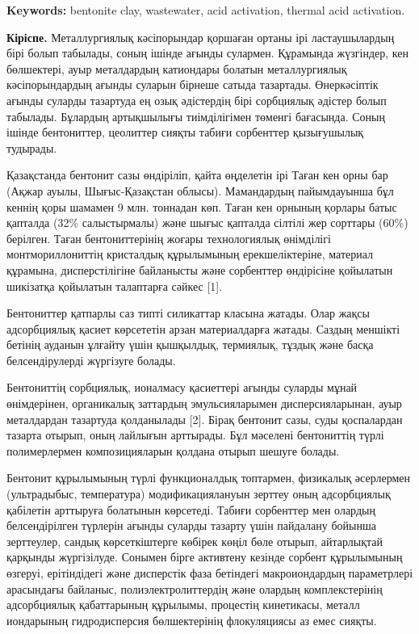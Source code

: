 {\bfseries Keywords:} bentonite clay, wastewater, acid activation, thermal
acid activation.

{\bfseries Кіріспе.} Металлургиялық кәсіпорындар қоршаған ортаны ірі
ластаушылардың бірі болып табылады, соның ішінде ағынды сулармен.
Құрамында жүзгіндер, кен бөлшектері, ауыр металдардың катиондары болатын
металлургиялық кәсіпорындардың ағынды суларын бірнеше сатыда тазартады.
Өнеркәсіптік ағынды суларды тазартуда ең озық әдістердің бірі сорбциялық
әдістер болып табылады. Бұлардың артықшылығы тиімділігімен төменгі
бағасында. Соның ішінде бентониттер, цеолиттер сияқты табиғи сорбенттер
қызығушылық тудырады.

Қазақстанда бентонит сазы өндіріліп, қайта өңделетін ірі Таған кен орны
бар (Ақжар ауылы, Шығыс-Қазақстан облысы). Мамандардың пайымдауынша бұл
кеннің қоры шамамен 9 млн. тоннадан көп. Таған кен орнының қорлары батыс
қапталда (32\% салыстырмалы) және шығыс қапталда сілтілі жер сорттары
(60\%) берілген. Таған бентониттерінің жоғары технологиялық өнімділігі
монтмориллониттің кристалдық құрылымының ерекшеліктеріне, материал
құрамына, дисперстілігіне байланысты және сорбенттер өндірісіне
қойылатын шикізатқа қойылатын талаптарға сәйкес {[}1{]}.

Бентониттер қатпарлы саз типті силикаттар класына жатады. Олар жақсы
адсорбциялық қасиет көрсететін арзан материалдарға жатады. Саздың
меншікті бетінің ауданын ұлғайту үшін қышқылдық, термиялық, тұздық және
басқа белсендірулерді жүргізуге болады.

Бентониттің сорбциялық, ионалмасу қасиеттері ағынды суларды мұнай
өнімдерінен, органикалық заттардың эмульсияларымен дисперсияларынан,
ауыр металдардан тазартуда қолданылады {[}2{]}. Бірақ бентонит сазы,
суды қоспалардан тазарта отырып, оның лайлығын арттырады. Бұл мәселені
бентониттің түрлі полимерлермен композицияларын қолдана отырып шешуге
болады.

Бентонит құрылымының түрлі функционалдық топтармен, физикалық әсерлермен
(ультрадыбыс, температура) модификациялануын зерттеу оның адсорбциялық
қабілетін арттыруға болатынын көрсетеді. Табиғи сорбенттер мен олардың
белсендірілген түрлерін ағынды суларды тазарту үшін пайдалану бойынша
зерттеулер, сандық көрсеткіштерге көбірек көңіл бөле отырып, айтарлықтай
қарқынды жүргізілуде. Сонымен бірге активтену кезінде сорбент
құрылымының өзгеруі, ерітіндідегі және дисперстік фаза бетіндегі
макроиондардың параметрлері арасындағы байланыс, полиэлектролиттердің
және олардың комплекстерінің адсорбциялық қабаттарының құрылымы,
процестің кинетикасы, металл иондарының гидродисперсия бөлшектерінің
флокуляциясы аз емес сияқты.

